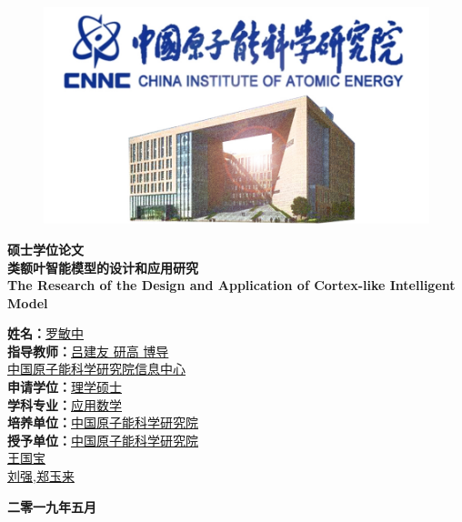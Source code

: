 \begin{titlepage}
\small
{}\uline{\makebox[7em][r]{}}\hfill {}
\uline{\makebox[7em][r]{}}

\uline{\makebox[7em][r]{}}\hfill {}
\uline{\makebox[7em][r]{}}
\normalsize

\vspace{10mm}

\begin{figure}[!h]
\centering
\includegraphics[trim=0 1 1 0, clip=true,width=13cm]{figures/ciae_logo_all.jpg}
\end{figure}

\vspace{7mm}

\begin{center}
 \textbf{硕士学位论文}\\[10mm]
 \textbf{类额叶智能模型的设计和应用研究}\\
 \textbf{The Research of the Design and Application of Cortex-like Intelligent Model}\\[10mm]
\end{center}
\large \textbf{姓\qquad 名：}\uline{\hfill{罗敏中}\hfill}\\
\large \textbf{指导教师：}\uline{\hfill{吕建友}{} {} 研高 {} {} 博导\hfill}\\
\large \makebox[5em][]{}\uline{\hfill{中国原子能科学研究院信息中心}\hfill}\\
\large \textbf{申请学位：}\uline{\hfill{理学硕士}\hfill}\\
\large \textbf{学科专业：}\uline{\hfill{应用数学}\hfill}\\
\large \textbf{培养单位：}\uline{\hfill{中国原子能科学研究院}\hfill}\\
\large \textbf{授予单位：}\uline{\hfill{中国原子能科学研究院}\hfill}\\[4mm]

\small
{}\uline{王国宝} \\ \uline{刘强,郑玉来}
\normalsize

\begin{center}
\textbf{二零一九年五月}
\end{center}
\end{titlepage}

\vspace*{10mm}
\thispagestyle{empty}